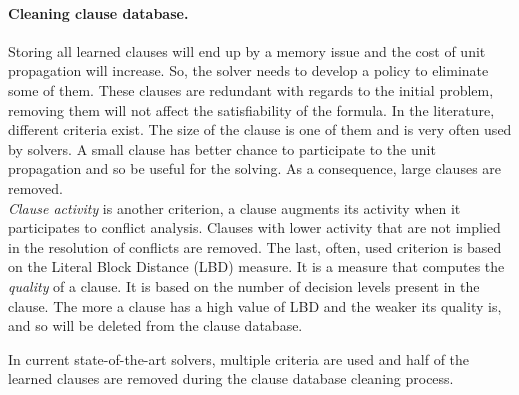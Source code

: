 \paragraph{Cleaning clause database.}
Storing  all learned clauses will end up by a memory issue and the cost of unit propagation will increase.
 So, the solver needs to develop a policy to eliminate some of them. These clauses are redundant with regards to the initial 
 problem, removing them will not affect the satisfiability of the formula.
  In the literature, different criteria exist.
 The size of the clause is one of them and is very often used by solvers. 
 A small clause has better chance to participate to the unit propagation and so be useful for the solving.
 As a consequence, large clauses are removed.\\
\emph{Clause activity} is another criterion, a clause augments its activity when it participates to conflict analysis. 
Clauses with lower activity that are not implied in the resolution of conflicts are removed.
 The last, often, used criterion is based on the Literal Block Distance (LBD) measure. It is a measure that computes the \emph{quality} of a clause.
It is based on the number of decision levels present in the clause. The more a clause has a high value of LBD and 
the weaker its quality is, and so will be deleted from the clause database.
 
In current state-of-the-art solvers, multiple criteria are used and half of the learned clauses are removed during the clause database cleaning process.

